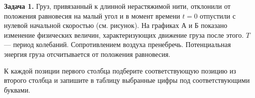 
\begin{taskbasic}[code={\label{task:energy_v1_n6}}]
\textbf{Задача 1.} Груз, привязанный к длинной нерастяжимой нити, отклонили от положения равновесия на малый угол и в момент времени $t=0$ отпустили с нулевой начальной скоростью (см. рисунок). На графиках А и Б показано изменение физических величин, характеризующих движение груза после этого. $T$ — период колебаний. Сопротивлением воздуха пренебречь. Потенциальная энергия груза отсчитывается от положения равновесия.

\nopagebreak\smallskip
\begin{center}
\end{center}

К каждой позиции первого столбца подберите соответствующую позицию из второго столбца и запишите в таблицу выбранные цифры под соответствующими буквами.


\end{taskbasic}
